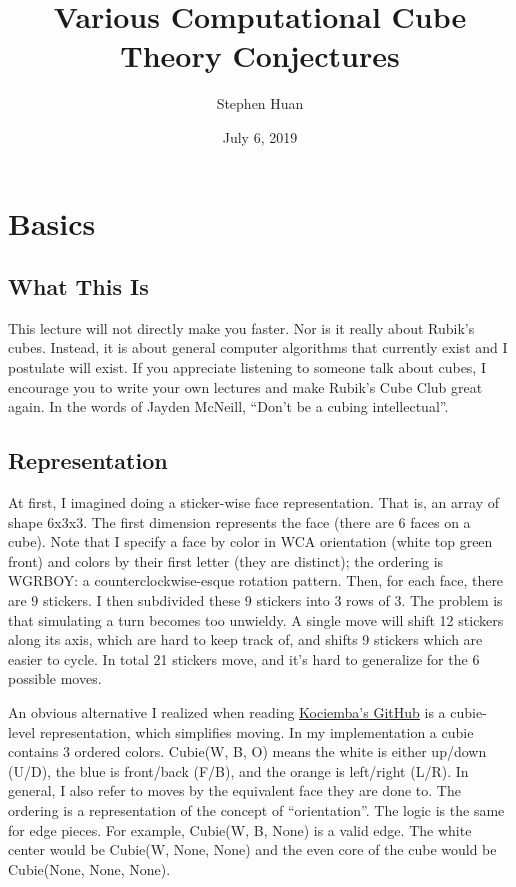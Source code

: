 \documentclass[11pt, oneside]{article}
\title{Various Computational Cube Theory Conjectures}
\author{Stephen Huan}
\date{July 6, 2019}
\begin{document}
\maketitle

\section{Basics}

\subsection{What This Is}
This lecture will not directly make you faster. Nor is it really about
Rubik's cubes. Instead, it is about general computer algorithms that
currently exist and I postulate will exist. If you appreciate listening
to someone talk about cubes, I encourage you to write your own lectures
and make Rubik's Cube Club great again. In the words of Jayden McNeill,
``Don't be a cubing intellectual''.

\subsection{Representation}
At first, I imagined doing a sticker-wise face representation. That is, an
array of shape 6x3x3. The first dimension represents the face (there are 6
faces on a cube). Note that I specify a face by color in WCA orientation (white
top green front) and colors by their first letter (they are distinct); the
ordering is WGRBOY: a counterclockwise-esque rotation pattern. Then, for each
face, there are 9 stickers. I then subdivided these 9 stickers into 3 rows of
3. The problem is that simulating a turn becomes too unwieldy. A single move
will shift 12 stickers along its axis, which are hard to keep track of, and
shifts 9 stickers which are easier to cycle. In total 21 stickers move, and
it's hard to generalize for the 6 possible moves.

An obvious alternative I realized when reading
\href{https://github.com/hkociemba/RubiksCube-TwophaseSolver}{Kociemba's
GitHub} is a cubie-level representation, which simplifies moving. In my
implementation a cubie contains 3 ordered colors. Cubie(W, B, O) means the
white is either up/down (U/D), the blue is front/back (F/B), and the orange
is left/right (L/R). In general, I also refer to moves by the equivalent
face they are done to. The ordering is a representation of the concept
of ``orientation''. The logic is the same for edge pieces. For example,
Cubie(W, B, None) is a valid edge. The white center would be Cubie(W, None,
None) and the even core of the cube would be Cubie(None, None, None).
\end{document}
